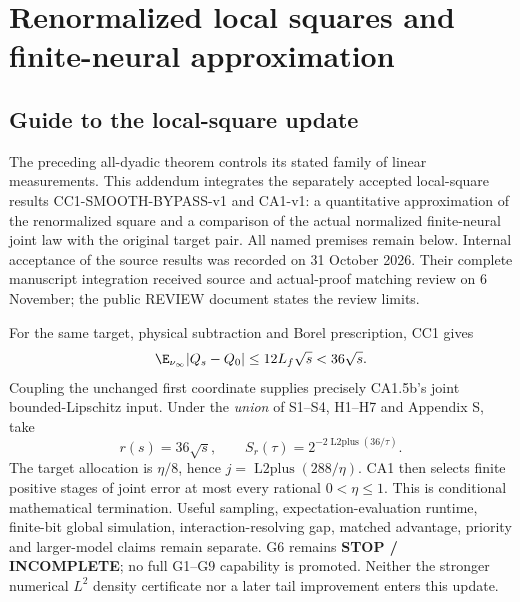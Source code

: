 \clearpage
\begingroup
\renewcommand{\addcontentsline}[3]{}
\section{Renormalized local squares and finite-neural approximation}
\label{cm:update}
\newcommand{\cmBL}{d_{\mathrm{BL}}}
\newcommand{\cmU}{d_{\mathcal U_4}}
\newcommand{\cmLtwo}{\operatorname{L2plus}}
\newcommand{\cmEXT}{\operatorname{EXT}}

\subsection*{Guide to the local-square update}
The preceding all-dyadic theorem controls its stated family of linear
measurements. This addendum integrates the separately accepted local-square
results CC1-SMOOTH-BYPASS-v1 and CA1-v1: a quantitative approximation of the
renormalized square and a comparison of the actual normalized finite-neural
joint law with the original target pair. All named premises remain below.
Internal acceptance of the source results was recorded on 31 October 2026.
Their complete manuscript integration received source and actual-proof matching
review on 6 November; the public REVIEW document states the review limits.

For the same target, physical subtraction and Borel prescription, CC1 gives
\[
 \E_{\nu_\infty}|Q_s-Q_0|\le12L_f\sqrt{s}<36\sqrt{s}.
\]
Coupling the unchanged first coordinate supplies precisely CA1.5b's joint
bounded-Lipschitz input. Under the \emph{union} of S1--S4, H1--H7 and
Appendix S, take
\[
 r(s)=36\sqrt{s},\qquad S_r(\tau)=2^{-2\cmLtwo(36/\tau)}.
\]
The target allocation is $\eta/8$, hence $j=\cmLtwo(288/\eta)$.
CA1 then selects finite positive stages of joint error at most every rational
$0<\eta\le1$. This is conditional mathematical termination. Useful sampling,
expectation-evaluation runtime, finite-bit global simulation,
interaction-resolving gap, matched advantage, priority and larger-model
claims remain separate. G6 remains \textbf{STOP / INCOMPLETE}; no full
G1--G9 capability is promoted. Neither the stronger numerical $L^2$ density
certificate nor a later tail improvement enters this update.


